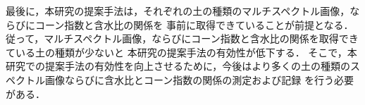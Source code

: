 最後に，本研究の提案手法は，それぞれの土の種類のマルチスペクトル画像，ならびにコーン指数と含水比の関係を
事前に取得できていることが前提となる．
従って，マルチスペクトル画像，ならびにコーン指数と含水比の関係を取得できている土の種類が少ないと
本研究の提案手法の有効性が低下する．
そこで，本研究での提案手法の有効性を向上させるために，今後はより多くの土の種類のスペクトル画像ならびに含水比とコーン指数の関係の測定および記録
を行う必要がある．

\newpage

